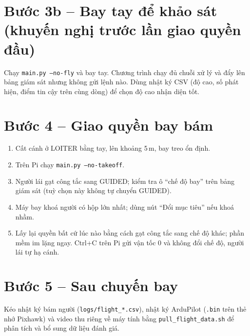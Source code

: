 \section*{Bước 3b -- Bay tay để khảo sát (khuyến nghị trước lần giao quyền đầu)}
Chạy \texttt{main.py --no-fly} và bay tay. Chương trình chạy đủ chuỗi xử lý và đẩy lên bảng giám sát nhưng không gửi lệnh nào. Dùng nhật ký CSV (độ cao, số phát hiện, điểm tin cậy trên cùng dòng) để chọn độ cao nhận diện tốt.

\section*{Bước 4 -- Giao quyền bay bám}
\begin{enumerate}
\item Cất cánh ở LOITER bằng tay, lên khoảng 5\,m, bay treo ổn định.
\item Trên Pi chạy \texttt{main.py --no-takeoff}.
\item Người lái gạt công tắc sang GUIDED; kiểm tra ô ``chế độ bay'' trên bảng giám sát (tuỳ chọn này không tự chuyển GUIDED).
\item Máy bay khoá người có hộp lớn nhất; dùng nút ``Đổi mục tiêu'' nếu khoá nhầm.
\item Lấy lại quyền bất cứ lúc nào bằng cách gạt công tắc sang chế độ khác; phần mềm im lặng ngay. Ctrl+C trên Pi gửi vận tốc 0 và không đổi chế độ, người lái tự hạ cánh.
\end{enumerate}

\section*{Bước 5 -- Sau chuyến bay}
Kéo nhật ký bám người (\texttt{logs/flight\_*.csv}), nhật ký ArduPilot (\texttt{.bin} trên thẻ nhớ Pixhawk) và video thu riêng về máy tính bằng \texttt{pull\_flight\_data.sh} để phân tích và bổ sung dữ liệu đánh giá.

